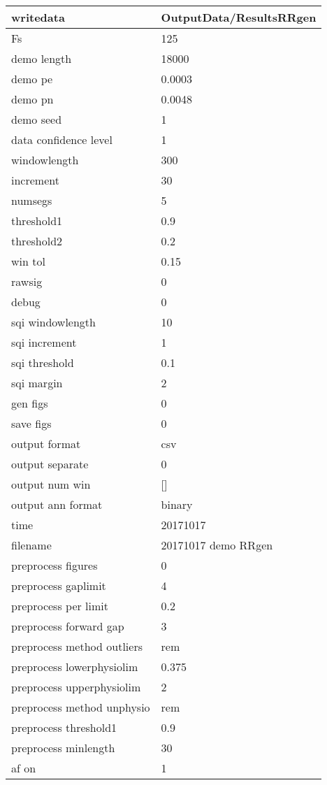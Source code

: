 \begin{tabular}{|l|l|}
\hline
writedata&OutputData/ResultsRRgen\\\hline
Fs&125\\\hline
demo length&18000\\\hline
demo pe&0.0003\\\hline
demo pn&0.0048\\\hline
demo seed&1\\\hline
data confidence level&1\\\hline
windowlength&300\\\hline
increment&30\\\hline
numsegs&5\\\hline
threshold1&0.9\\\hline
threshold2&0.2\\\hline
win tol&0.15\\\hline
rawsig&0\\\hline
debug&0\\\hline
sqi windowlength&10\\\hline
sqi increment&1\\\hline
sqi threshold&0.1\\\hline
sqi margin&2\\\hline
gen figs&0\\\hline
save figs&0\\\hline
output format&csv\\\hline
output separate&0\\\hline
output num win&[]\\\hline
output ann format&binary\\\hline
time&20171017\\\hline
filename&20171017 demo RRgen\\\hline
preprocess figures&0\\\hline
preprocess gaplimit&4\\\hline
preprocess per limit&0.2\\\hline
preprocess forward gap&3\\\hline
preprocess method outliers&rem\\\hline
preprocess lowerphysiolim&0.375\\\hline
preprocess upperphysiolim&2\\\hline
preprocess method unphysio&rem\\\hline
preprocess threshold1&0.9\\\hline
preprocess minlength&30\\\hline
af on&1\\\hline

\end{tabular}
